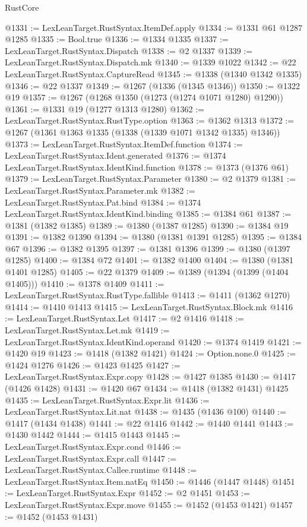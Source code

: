 \begin{lexlean}{RustCore}
\begin{coremodule}
@1331 := LexLeanTarget.RustSyntax.ItemDef.apply
@1334 := @1331 @61 @1287 @1285
@1335 := Bool.true
@1336 := @1334 @1335
@1337 := LexLeanTarget.RustSyntax.Dispatch
@1338 := @2 @1337
@1339 := LexLeanTarget.RustSyntax.Dispatch.mk
@1340 := @1339 @1022
@1342 := @22 LexLeanTarget.RustSyntax.CaptureRead
@1345 := @1338 (@1340 @1342 @1335)
@1346 := @22 @1337
@1349 := @1267 (@1336 (@1345 @1346))
@1350 := @1322 @19
@1357 := @1267 (@1268 @1350 (@1273 (@1274 @1071 @1280) @1290))
@1361 := @1331 @19 (@1277 @1313 @1280)
@1362 := LexLeanTarget.RustSyntax.RustType.option
@1363 := @1362 @1313
@1372 := @1267 (@1361 @1363 @1335 (@1338 (@1339 @1071 @1342 @1335) @1346))
@1373 := LexLeanTarget.RustSyntax.ItemDef.function
@1374 := LexLeanTarget.RustSyntax.Ident.generated
@1376 := @1374 LexLeanTarget.RustSyntax.IdentKind.function
@1378 := @1373 (@1376 @61)
@1379 := LexLeanTarget.RustSyntax.Parameter
@1380 := @2 @1379
@1381 := LexLeanTarget.RustSyntax.Parameter.mk
@1382 := LexLeanTarget.RustSyntax.Pat.bind
@1384 := @1374 LexLeanTarget.RustSyntax.IdentKind.binding
@1385 := @1384 @61
@1387 := @1381 (@1382 @1385)
@1389 := @1380 (@1387 @1285)
@1390 := @1384 @19
@1391 := @1382 @1390
@1394 := @1380 (@1381 @1391 @1285)
@1395 := @1384 @67
@1396 := @1382 @1395
@1397 := @1381 @1396
@1399 := @1380 (@1397 @1285)
@1400 := @1384 @72
@1401 := @1382 @1400
@1404 := @1380 (@1381 @1401 @1285)
@1405 := @22 @1379
@1409 := @1389 (@1394 (@1399 (@1404 @1405)))
@1410 := @1378 @1409
@1411 := LexLeanTarget.RustSyntax.RustType.fallible
@1413 := @1411 (@1362 @1270)
@1414 := @1410 @1413
@1415 := LexLeanTarget.RustSyntax.Block.mk
@1416 := LexLeanTarget.RustSyntax.Let
@1417 := @2 @1416
@1418 := LexLeanTarget.RustSyntax.Let.mk
@1419 := LexLeanTarget.RustSyntax.IdentKind.operand
@1420 := @1374 @1419
@1421 := @1420 @19
@1423 := @1418 (@1382 @1421)
@1424 := Option.none.{0}
@1425 := @1424 @1276
@1426 := @1423 @1425
@1427 := LexLeanTarget.RustSyntax.Expr.copy
@1428 := @1427 @1385
@1430 := @1417 (@1426 @1428)
@1431 := @1420 @67
@1434 := @1418 (@1382 @1431) @1425
@1435 := LexLeanTarget.RustSyntax.Expr.lit
@1436 := LexLeanTarget.RustSyntax.Lit.nat
@1438 := @1435 (@1436 @100)
@1440 := @1417 (@1434 @1438)
@1441 := @22 @1416
@1442 := @1440 @1441
@1443 := @1430 @1442
@1444 := @1415 @1443
@1445 := LexLeanTarget.RustSyntax.Expr.cond
@1446 := LexLeanTarget.RustSyntax.Expr.call
@1447 := LexLeanTarget.RustSyntax.Callee.runtime
@1448 := LexLeanTarget.RustSyntax.Item.natEq
@1450 := @1446 (@1447 @1448)
@1451 := LexLeanTarget.RustSyntax.Expr
@1452 := @2 @1451
@1453 := LexLeanTarget.RustSyntax.Expr.move
@1455 := @1452 (@1453 @1421)
@1457 := @1452 (@1453 @1431)

\end{coremodule}
\end{lexlean}

